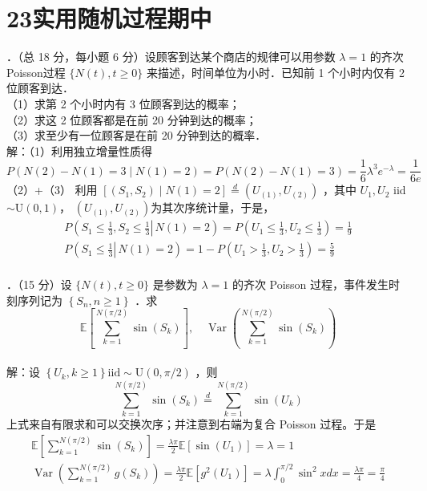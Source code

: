 \documentclass[UTF8,openany]{book}
\begin{document}
\section{\centering 23实用随机过程期中}
．（总 18 分，每小题 6 分）设顾客到达某个商店的规律可以用参数 $\lambda=1$ 的齐次 Poisson过程 $\{N(t), t \geq 0\}$ 来描述，时间单位为小时．已知前 1 个小时内仅有 2 位顾客到达．\\
（1）求第 2 个小时内有 3 位顾客到达的概率；\\
（2）求这 2 位顾客都是在前 20 分钟到达的概率；\\
（3）求至少有一位顾客是在前 20 分钟到达的概率．\\
解：（1）利用独立增量性质得
$$
P(N(2)-N(1)=3 \mid N(1)=2)=P(N(2)-N(1)=3)=\frac{1}{6} \lambda^{3} e^{-\lambda}=\frac{1}{6 e}
$$
（2）+（3） 利用 $\left[\left(S_{1}, S_{2}\right) \mid N(1)=2\right] \stackrel{d}{=}\left(U_{(1)}, U_{(2)}\right)$ ，其中 $U_{1}, U_{2}$ iid $\sim \mathrm{U}(0,1)$， $\left(U_{(1)}, U_{(2)}\right)$为其次序统计量，于是，
$$
\begin{gathered}
	P\left(S_{1} \leq \frac{1}{3}, \left.S_{2} \leq \frac{1}{3} \right\rvert\, N(1)=2\right)=P\left(U_{1} \leq \frac{1}{3}, U_{2} \leq \frac{1}{3}\right)=\frac{1}{9} \\
	P\left(\left.S_{1} \leq \frac{1}{3} \right\rvert\, N(1)=2\right)=1-P\left(U_{1}>\frac{1}{3}, U_{2}>\frac{1}{3}\right)=\frac{5}{9}
\end{gathered}
$$\\


．（15 分）设 $\{N(t), t \geq 0\}$ 是参数为 $\lambda=1$ 的齐次 Poisson 过程，事件发生时刻序列记为 $\left\{S_{n}, n \geq 1\right\}$ ．求
$$
\mathbb{E}\left[\sum_{k=1}^{N(\pi / 2)} \sin \left(S_{k}\right)\right], \quad \operatorname{Var}\left(\sum_{k=1}^{N(\pi / 2)} \sin \left(S_{k}\right)\right)
$$\\
解：设 $\left\{U_{k}, k \geq 1\right\} \mathrm{iid} \sim \mathrm{U}(0, \pi / 2)$ ，则
$$
\sum_{k=1}^{N(\pi / 2)} \sin \left(S_{k}\right) \stackrel{d}{=} \sum_{k=1}^{N(\pi / 2)} \sin \left(U_{k}\right)
$$
上式来自有限求和可以交换次序；并注意到右端为复合 Poisson 过程。于是
$$
\begin{gathered}
	\mathbb{E}\left[\sum_{k=1}^{N(\pi / 2)} \sin \left(S_{k}\right)\right]=\frac{\lambda \pi}{2} \mathbb{E}\left[\sin \left(U_{1}\right)\right]=\lambda=1 \\
	\operatorname{Var}\left(\sum_{k=1}^{N(\pi / 2)} g\left(S_{k}\right)\right)=\frac{\lambda \pi}{2} \mathbb{E}\left[g^{2}\left(U_{1}\right)\right]=\lambda \int_{0}^{\pi / 2} \sin ^{2} x d x=\frac{\lambda \pi}{4}=\frac{\pi}{4}
\end{gathered}
$$\\
\end{document}

